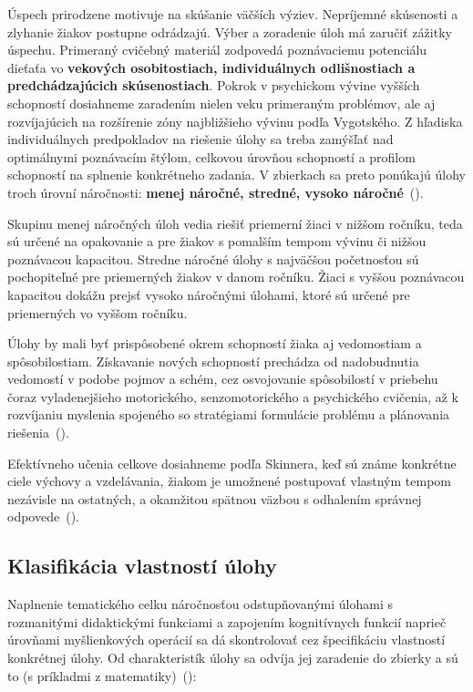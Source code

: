 Úspech prirodzene motivuje na skúšanie väčších výziev. Nepríjemné skúsenosti a zlyhanie žiakov postupne odrádzajú. Výber a zoradenie úloh má zaručiť zážitky úspechu. Primeraný cvičebný materiál zodpovedá poznávaciemu potenciálu dieťaťa vo \textbf{vekových osobitostiach, individuálnych odlišnostiach a predchádzajúcich skúsenostiach}. Pokrok v psychickom vývine vyšších schopností dosiahneme zaradením nielen veku primeraným problémov, ale aj rozvíjajúcich na rozšírenie zóny najbližšieho vývinu podľa Vygotského. Z hľadiska individuálnych predpokladov na riešenie úlohy sa treba zamýšľať nad optimálnymi poznávacím štýlom, celkovou úrovňou schopností a profilom schopností na splnenie konkrétneho zadania. V zbierkach sa preto ponúkajú úlohy troch úrovní náročnosti: \textbf{menej náročné, stredné, vysoko náročné}~(\cite{pavlovkin_ziak_1989}).
 
Skupinu menej náročných úloh vedia riešiť priemerní žiaci v nižšom ročníku, teda sú určené na opakovanie a pre žiakov s pomalším tempom vývinu či nižšou poznávacou kapacitou. Stredne náročné úlohy s najväčšou početnosťou sú pochopiteľné pre priemerných žiakov v danom ročníku. Žiaci s vyššou poznávacou kapacitou dokážu prejsť vysoko náročnými úlohami, ktoré sú určené pre priemerných vo vyššom ročníku.
 
Úlohy by mali byť prispôsobené okrem schopností žiaka aj vedomostiam a spôsobilostiam. Získavanie nových schopností prechádza od nadobudnutia vedomostí v podobe pojmov a schém, cez osvojovanie spôsobilostí v priebehu čoraz vyladenejšieho motorického, senzomotorického a psychického cvičenia, až k rozvíjaniu myslenia spojeného so stratégiami formulácie problému a plánovania riešenia~(\cite{pavlovkin_ziak_1989}).

Efektívneho učenia celkove dosiahneme podľa Skinnera, keď sú známe konkrétne ciele výchovy a vzdelávania, žiakom je umožnené postupovať vlastným tempom nezávisle na ostatných, a okamžitou spätnou väzbou s odhalením správnej odpovede~(\cite{pavlovkin_ziak_1989}).


\subsection{Klasifikácia vlastností úlohy} \label{sec:klasifikacia-ulohy}
Naplnenie tematického celku náročnosťou odstupňovanými úlohami s rozmanitými didaktickými funkciami a zapojením kognitívnych funkcií naprieč úrovňami myšlienkových operácií sa dá skontrolovať cez špecifikáciu vlastností konkrétnej úlohy. Od charakteristík úlohy sa odvíja  jej zaradenie do zbierky a sú to (s príkladmi z matematiky)~(\cite{mindakova_tvorba_2008}):

